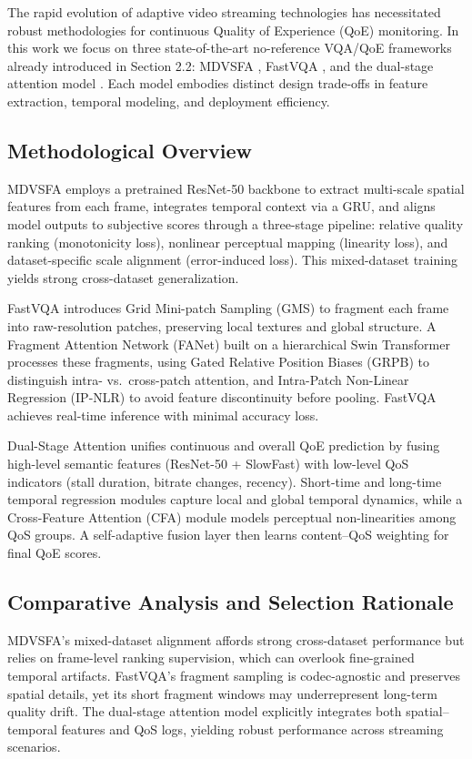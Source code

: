 The rapid evolution of adaptive video streaming technologies has necessitated robust methodologies for continuous Quality of Experience (QoE) monitoring. In this work we focus on three state-of-the-art no-reference VQA/QoE frameworks already introduced in Section 2.2: MDVSFA \cite{li2023unified}, FastVQA \cite{wu2022fastvqa}, and the dual-stage attention model \cite{jia2024continuous}. Each model embodies distinct design trade-offs in feature extraction, temporal modeling, and deployment efficiency.

\subsection{Methodological Overview}  
MDVSFA \cite{li2023unified} employs a pretrained ResNet-50 backbone to extract multi-scale spatial features from each frame, integrates temporal context via a GRU, and aligns model outputs to subjective scores through a three-stage pipeline: relative quality ranking (monotonicity loss), nonlinear perceptual mapping (linearity loss), and dataset-specific scale alignment (error-induced loss). This mixed-dataset training yields strong cross-dataset generalization.  

FastVQA \cite{wu2022fastvqa} introduces Grid Mini-patch Sampling (GMS) to fragment each frame into raw-resolution patches, preserving local textures and global structure. A Fragment Attention Network (FANet) built on a hierarchical Swin Transformer processes these fragments, using Gated Relative Position Biases (GRPB) to distinguish intra- vs.\ cross-patch attention, and Intra-Patch Non-Linear Regression (IP-NLR) to avoid feature discontinuity before pooling. FastVQA achieves real-time inference with minimal accuracy loss.  

Dual-Stage Attention \cite{jia2024continuous} unifies continuous and overall QoE prediction by fusing high-level semantic features (ResNet-50 + SlowFast) with low-level QoS indicators (stall duration, bitrate changes, recency). Short-time and long-time temporal regression modules capture local and global temporal dynamics, while a Cross-Feature Attention (CFA) module models perceptual non-linearities among QoS groups. A self-adaptive fusion layer then learns content–QoS weighting for final QoE scores.

\subsection{Comparative Analysis and Selection Rationale}  
MDVSFA's mixed-dataset alignment affords strong cross-dataset performance but relies on frame-level ranking supervision, which can overlook fine-grained temporal artifacts. FastVQA's fragment sampling is codec-agnostic and preserves spatial details, yet its short fragment windows may underrepresent long-term quality drift. The dual-stage attention model explicitly integrates both spatial–temporal features and QoS logs, yielding robust performance across streaming scenarios.  

